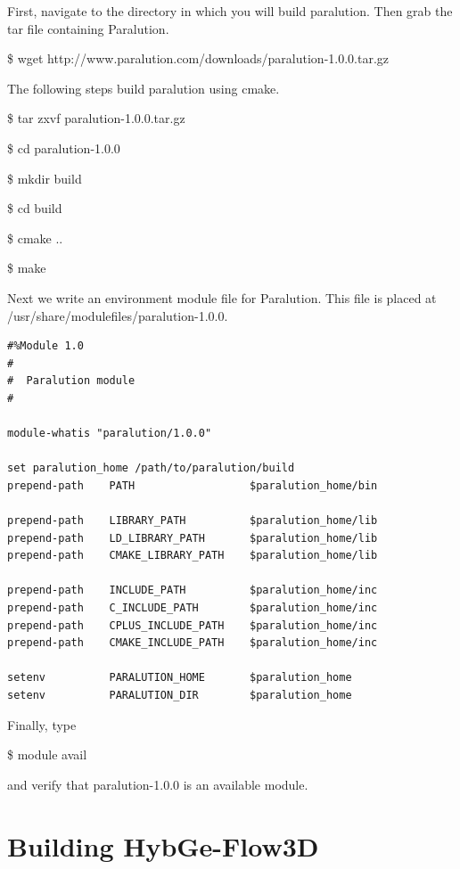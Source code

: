 \documentclass{report}
\begin{document}
\noindent First, navigate to the directory in which you will build paralution.
Then grab the tar file containing Paralution.

\begin{mdframed}[style=MyFrame]
\$ wget http://www.paralution.com/downloads/paralution-1.0.0.tar.gz
\end{mdframed}

\noindent The following steps build paralution using cmake.

\begin{mdframed}[style=MyFrame]
  \$ tar zxvf paralution-1.0.0.tar.gz

  \noindent\$ cd paralution-1.0.0

  \noindent\$ mkdir build

  \noindent\$ cd build

  \noindent\$ cmake ..

  \noindent\$ make
\end{mdframed}

\noindent Next we write an environment module file for Paralution.
This file is placed at /usr/share/modulefiles/paralution-1.0.0.

\lstset{style=custom}
\begin{lstlisting}
#%Module 1.0
#
#  Paralution module
#

module-whatis "paralution/1.0.0"

set paralution_home /path/to/paralution/build
prepend-path    PATH                  $paralution_home/bin

prepend-path    LIBRARY_PATH          $paralution_home/lib
prepend-path    LD_LIBRARY_PATH       $paralution_home/lib
prepend-path    CMAKE_LIBRARY_PATH    $paralution_home/lib

prepend-path    INCLUDE_PATH          $paralution_home/inc
prepend-path    C_INCLUDE_PATH        $paralution_home/inc
prepend-path    CPLUS_INCLUDE_PATH    $paralution_home/inc
prepend-path    CMAKE_INCLUDE_PATH    $paralution_home/inc

setenv          PARALUTION_HOME       $paralution_home
setenv          PARALUTION_DIR        $paralution_home
\end{lstlisting}

\noindent Finally, type
\begin{mdframed}[style=MyFrame]
  \$ module avail
\end{mdframed}
and verify that paralution-1.0.0 is an available module.

\section{Building HybGe-Flow3D}
\end{document}
